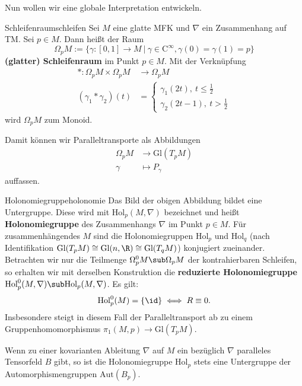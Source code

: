 Nun wollen wir eine globale Interpretation entwickeln.
\begin{definition}{Schleifenraum}{schleifen}
Sei $M$ eine glatte MFK und $\nabla$ ein Zusammenhang auf TM. Sei $p \in M$. Dann heißt der Raum
\begin{equation}
\Omega_p M := \{ \gamma: [0,1] \to M \ | \ \gamma \in \text{C}^\infty, \gamma(0)=\gamma(1)=p\}
\end{equation}
\textbf{(glatter) Schleifenraum} im Punkt $p \in M$. Mit der Verknüpfung 
\begin{align}
\ast: \Omega_p M \times \Omega_p M &\to \Omega_p M\\
(\gamma_1 \ast \gamma_2)(t) &= 
\begin{cases}
    \gamma_1(2t), \ t \leq \frac{1}{2}\\
    \gamma_2(2t-1), \ t > \frac{1}{2}
\end{cases}
\end{align}
wird $\Omega_p M$ zum Monoid.
\end{definition}
Damit können wir Paralleltransporte als Abbildungen 
\begin{align}
\Omega_p M &\to \text{Gl}(T_pM)\\
\gamma &\mapsto P_\gamma
\end{align}
auffassen. 
\begin{satz}{Holonomiegruppe}{holonomie}
Das Bild der obigen Abbildung bildet eine Untergruppe. Diese wird mit $\text{Hol}_p (M, \nabla)$ bezeichnet und heißt \textbf{Holonomiegruppe} des Zusammenhangs $\nabla$ im Punkt $p \in M$. Für zusammenhängendes $M$ sind die Holonomiegruppen $\text{Hol}_p$ und $\text{Hol}_q$ (nach Identifikation $\text{Gl}(T_pM) \cong \text{Gl}(n, \R) \cong \text{Gl}(T_qM)$) konjugiert zueinander.\\
Betrachten wir nur die Teilmenge $\Omega_p^0 M  \sub \Omega_p M$ der kontrahierbaren Schleifen, so erhalten wir mit derselben Konstruktion die \textbf{reduzierte Holonomiegruppe} $\text{Hol}^0_p (M, \nabla) \sub \text{Hol}_p (M, \nabla)$. Es gilt:
\begin{equation}
\text{Hol}_p^0 (M) = \{ \id \} \iff R \equiv 0.
\end{equation}
Insbesondere steigt in diesem Fall der Paralleltransport ab zu einem Gruppenhomomorphismus $\pi_1 (M,p) \to \text{Gl}(T_pM)$.
\end{satz}
\begin{bemerkung}
Wenn zu einer kovarianten Ableitung $\nabla$ auf $M$ ein bezüglich $\nabla$ paralleles Tensorfeld $B$ gibt, so ist die Holonomiegruppe $\text{Hol}_p$ stets eine Untergruppe der Automorphismengruppen $\text{Aut}(B_p)$.
\end{bemerkung}
